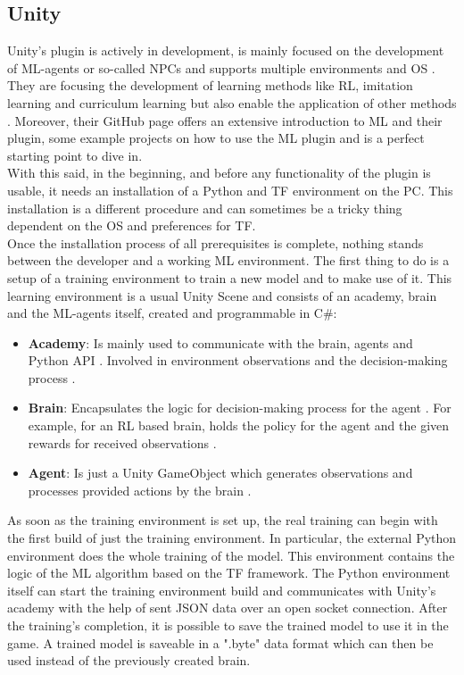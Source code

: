 \documentclass[MGS,Master,english]{twbook}%
\begin{document}
\subsection{Unity}
Unity's plugin is actively in development, is mainly focused on the development of ML-agents or so-called \ac{NPC}s and supports multiple environments and \ac{OS} \cite{unity::mlGithub}. They are focusing the development of learning methods like RL, imitation learning and curriculum learning but also enable the application of other methods \cite{unity::mlGithub}. Moreover, their GitHub page offers an extensive introduction to ML and their plugin, some example projects on how to use the ML plugin and is a perfect starting point to dive in. \\
With this said, in the beginning, and before any functionality of the plugin is usable, it needs an installation of a Python and \ac{TF} environment on the PC. This installation is a different procedure and can sometimes be a tricky thing dependent on the \ac{OS} and preferences for \ac{TF}.\\
Once the installation process of all prerequisites is complete, nothing stands between the developer and a working ML environment. The first thing to do is a setup of a training environment to train a new model and to make use of it. This learning environment is a usual Unity Scene and consists of an academy, brain and the ML-agents itself, created and programmable in C\#:
\begin{itemize}
	\item \textbf{Academy}: Is mainly used to communicate with the brain, agents and Python API \cite{unity::mlGithub}. Involved in environment observations and the decision-making process \cite{unity::mlGithub}. 
	\item \textbf{Brain}: Encapsulates the logic for decision-making process for the agent \cite{unity::mlGithub}. For example, for an RL based brain, holds the policy for the agent and the given rewards for received observations \cite{unity::mlGithub}.
	\item \textbf{Agent}: Is just a Unity GameObject which generates observations and processes provided actions by the brain \cite{unity::mlGithub}.
\end{itemize}  
As soon as the training environment is set up, the real training can begin with the first build of just the training environment. In particular, the external Python environment does the whole training of the model. This environment contains the logic of the ML algorithm based on the \ac{TF} framework. The Python environment itself can start the training environment build and communicates with Unity’s academy with the help of sent \ac{JSON} data over an open socket connection. After the training's completion, it is possible to save the trained model to use it in the game. A trained model is saveable in a ".byte" data format which can then be used instead of the previously created brain.
\end{document}
